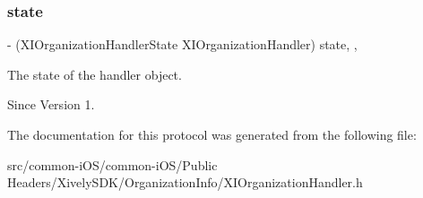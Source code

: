 \subsubsection{\texorpdfstring{state}{state}}
{\footnotesize\ttfamily -\/ (X\+I\+Organization\+Handler\+State X\+I\+Organization\+Handler) state\hspace{0.3cm}{\ttfamily [read]}, {\ttfamily [nonatomic]}, {\ttfamily [assign]}}



The state of the handler object. 

\begin{DoxySince}{Since}
Version 1. 
\end{DoxySince}


The documentation for this protocol was generated from the following file\+:\begin{DoxyCompactItemize}
\item 
src/common-\/i\+O\+S/common-\/i\+O\+S/\+Public Headers/\+Xively\+S\+D\+K/\+Organization\+Info/X\+I\+Organization\+Handler.\+h\end{DoxyCompactItemize}
